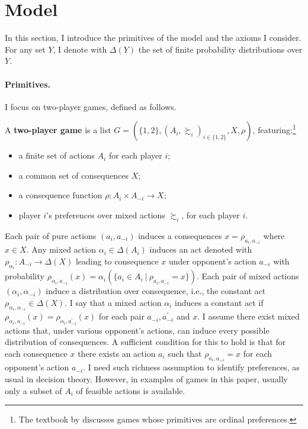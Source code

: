 \section{Model}\label{sec:modeluniv}

In this section, I introduce the primitives of the model and the axioms I consider. For any set \( Y \), I denote with \( \Delta ( Y ) \) the set of finite probability distributions over \( Y \).

\paragraph{Primitives.} I focus on two-player games, defined as follows.

\begin{definition}\label{def:game}
	A \textbf{two-player game} is a list \( G = ( \{1,2 \}, ( A_i, \succsim_i )_{i \in \{1,2 \}}, X,  \rho ) \), featuring:\footnote{The textbook by \cite{bonannoGameTheory2018} discusses games whose primitives are ordinal preferences.}
	\begin{itemize}
		\item a finite set of actions \(A_i\) for each player \( i \);
		\item a common set of consequences \( X \);
		\item a consequence function \(\rho \colon A_i \times  A_{-i} \rightarrow X \);
		\item player \(i\)'s preferences over mixed actions \(\succsim_i \), for each player \( i \).
	\end{itemize}
\end{definition}

Each pair of pure actions \( (a_i, a_{-i} ) \) induces a consequences \( x = \rho_{a_i, a_{-i}} \) where \( x \in X \). Any mixed action \( \alpha_i \in \Delta ( A_i ) \) induces an \citeauthor{anscombeDefinitionSubjectiveProbability1963} act denoted with \( \rho_{\alpha_i} \colon A_{-i} \rightarrow \Delta ( X ) \) leading to consequence \( x \) under opponent's action \( a_{-i} \) with probability \( \rho_{\alpha_i,a_{-i}} ( x ) = \alpha_i ( \{ a_i \in A_i \: | \: \rho_{a_i,a_{-i}} = x \} ) \). Each pair of mixed actions \( (\alpha_i, \alpha_{-i}) \) induce a distribution over consequence, i.e., the constant act \( \rho_{\alpha_i, \alpha_{-i}} \in \Delta (X) \). I say that a mixed action \( \alpha_i \) induces a constant act if \( \rho_{\alpha_i, a_{-i}} (x) = \rho_{\alpha_i, a^{\prime}_{-i}} (x) \) for each pair \(a_{-i}, a^{\prime}_{-i} \) and \( x \). I assume there exist mixed actions that, under various opponent's actions, can induce every possible distribution of consequences. A sufficient condition for this to hold is that for each consequence \( x \) there exists an action \( a_i \) such that \( \rho_{a_i,a_{-i}} = x \) for each opponent's action \( a_{-i} \). I need such richness assumption to identify preferences, as usual in decision theory. However, in examples of games in this paper, usually only a subset of \( A_i \) of feasible actions is available.

